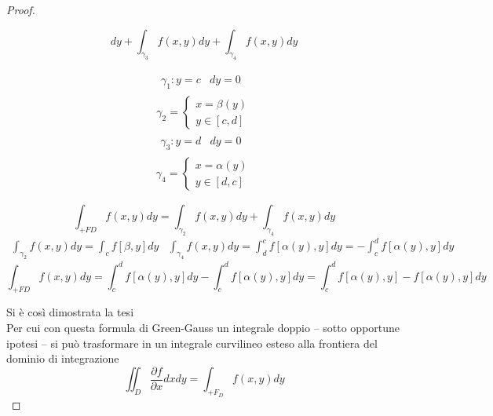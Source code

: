 \begin{proof}
\begin{description}
\begin{equation}
				dy+\int_{\gamma_3}f(x,y)dy+\int_{\gamma_4}f(x,y)dy
			\end{equation}
			\begin{multicols}{2}
				\begin{equation*}
					\begin{matrix}
						\begin{matrix}
							\gamma_1: y=c & dy=0
						\end{matrix}\\
						\gamma_2=\begin{cases}
							x=\beta(y)\\
							y\in[c,d]
						\end{cases}
					\end{matrix}
				\end{equation*}
				\begin{equation*}
					\begin{matrix}
						\begin{matrix}
							\gamma_3: y=d & dy=0
						\end{matrix}\\
						\gamma_4=\begin{cases}
							x=\alpha(y)\\
							y\in[d,c]
						\end{cases}
					\end{matrix}
				\end{equation*}
			\end{multicols}
			\begin{equation*}
				\int_{+FD}f(x,y)dy=\int_{\gamma_2}f(x,y)dy+\int_{\gamma_4}f(x,y)
				dy
			\end{equation*}
			\begin{equation*}
				\begin{matrix}
					\int_{\gamma_2}f(x,y)dy=\int_c f[\beta,y]dy &
					\int_{\gamma_4}f(x,y)dy=\int_{d}^{c}f[\alpha(y),y]dy=
					-\int_{c}^{d}f[\alpha(y),y]dy
				\end{matrix}
			\end{equation*}
			\begin{equation*}
				\int_{+FD}f(x,y)dy=\int_{c}^{d}f[\alpha(y),y]dy-
				\int_{c}^{d}f[\alpha(y),y]dy=\int_{c}^{d}f[\alpha(y),y]-
				f[\alpha(y),y]dy
			\end{equation*}
	\end{description}
	Si è così dimostrata la tesi\\
	Per cui con questa {\color{red}formula di Green-Gauss} un integrale doppio
	-- sotto opportune ipotesi -- si può trasformare in un integrale curvilineo
	esteso alla frontiera del dominio di integrazione
	\begin{equation*}
		\iint_D \frac{\partial f}{\partial x}dxdy=\int_{+F_D}f(x,y)dy
	\end{equation*}
\end{proof}
